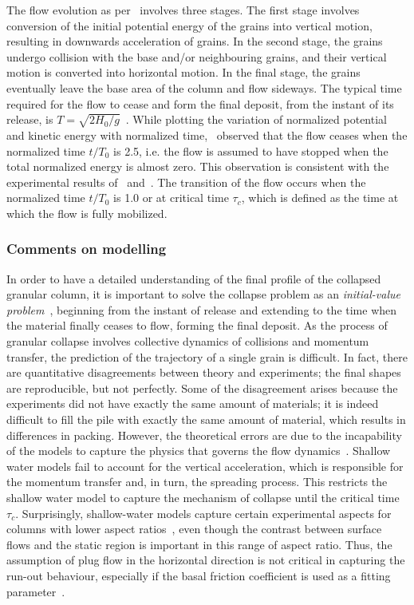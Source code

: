 The flow evolution as per~\citet{Staron2005} involves three stages. The first 
stage involves conversion of the initial potential energy of the grains into 
vertical motion, resulting in downwards acceleration of grains. In the second 
stage, the grains undergo collision with the base and/or neighbouring grains, 
and their vertical motion is converted into horizontal motion. In the final 
stage, the grains eventually leave the base area of the column and flow 
sideways. The typical time required for the flow to cease and form the final 
deposit, from the instant of its release, is 
$\textit{T}=\sqrt{2\textit{H}_{\textit{0}}/\textit{g}}$~\citep{Staron2005}. 
While plotting the variation of normalized potential and kinetic energy with 
normalized time,~\citet{Staron2005} observed that the flow ceases when the 
normalized time $\textit{t}/\textit{T}_0$ is 2.5, i.e. the flow is assumed to 
have stopped when the total normalized energy is almost zero. This observation 
is consistent with the experimental results of~\citet{Lube2005} 
and~\citet{Lajeunesse2005}. The transition of the flow occurs when the 
normalized time $\textit{t}/\textit{T}_0$ is 1.0 or at critical time 
$\tau_{\textit{c}}$, which is defined as the time at which the flow is fully 
mobilized.

\subsubsection{Comments on modelling}
In order to have a detailed understanding of the final profile of the collapsed 
granular column, it is important to solve the collapse problem as an 
\textit{initial-value problem}~\citep{Balmforth2005}, beginning from the 
instant of release and extending to the time when the material finally ceases 
to flow, forming the final deposit. As the process of granular collapse 
involves collective dynamics of collisions and momentum transfer, the 
prediction of the trajectory of a single grain is difficult. In fact, there are 
quantitative disagreements between theory and experiments; the final shapes are 
reproducible, but not perfectly. Some of the disagreement arises because the 
experiments did not have exactly the same amount of materials; it is indeed 
difficult to fill the pile with exactly the same amount of material, which 
results in differences in packing. However, the theoretical errors are due to 
the incapability of the models to capture the physics that governs the flow 
dynamics~\citep{Balmforth2005}. Shallow water models fail to account for the 
vertical acceleration, which is responsible for the momentum transfer and, in 
turn, the spreading process. This restricts the shallow water model to capture 
the mechanism of collapse until the critical time $\tau_{\textit{c}}$. 
Surprisingly, shallow-water models capture certain experimental aspects for 
columns with lower aspect 
ratios~\citep{Mangeney2010,Balmforth2005,Kerswell2005}, even though the 
contrast between surface flows and the static region is important in this range 
of aspect ratio. Thus, the assumption of plug flow in the horizontal direction 
is not critical in capturing the run-out behaviour, especially if the basal 
friction coefficient is used as a fitting parameter~\citep{Lajeunesse2005}. 

